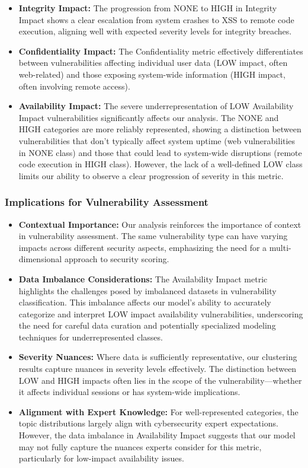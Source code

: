 \begin{itemize}
	\item \textbf{Integrity Impact:} The progression from NONE to HIGH in Integrity Impact shows a clear escalation from system crashes to XSS to remote code execution, aligning well with expected severity levels for integrity breaches.
	\item \textbf{Confidentiality Impact:} The Confidentiality metric effectively differentiates between vulnerabilities affecting individual user data (LOW impact, often web-related) and those exposing system-wide information (HIGH impact, often involving remote access).
	\item \textbf{Availability Impact:} The severe underrepresentation of LOW Availability Impact vulnerabilities significantly affects our analysis. The NONE and HIGH categories are more reliably represented, showing a distinction between vulnerabilities that don't typically affect system uptime (web vulnerabilities in NONE class) and those that could lead to system-wide disruptions (remote code execution in HIGH class). However, the lack of a well-defined LOW class limits our ability to observe a clear progression of severity in this metric.
\end{itemize}


\subsubsection{Implications for Vulnerability Assessment}

\begin{itemize}
	\item \textbf{Contextual Importance:} Our analysis reinforces the importance of context in vulnerability assessment. The same vulnerability type can have varying impacts across different security aspects, emphasizing the need for a multi-dimensional approach to security scoring.
	\item \textbf{Data Imbalance Considerations:} The Availability Impact metric highlights the challenges posed by imbalanced datasets in vulnerability classification. This imbalance affects our model's ability to accurately categorize and interpret LOW impact availability vulnerabilities, underscoring the need for careful data curation and potentially specialized modeling techniques for underrepresented classes.
	\item \textbf{Severity Nuances:} Where data is sufficiently representative, our clustering results capture nuances in severity levels effectively. The distinction between LOW and HIGH impacts often lies in the scope of the vulnerability---whether it affects individual sessions or has system-wide implications.
	\item \textbf{Alignment with Expert Knowledge:} For well-represented categories, the topic distributions largely align with cybersecurity expert expectations. However, the data imbalance in Availability Impact suggests that our model may not fully capture the nuances experts consider for this metric, particularly for low-impact availability issues.
\end{itemize}

